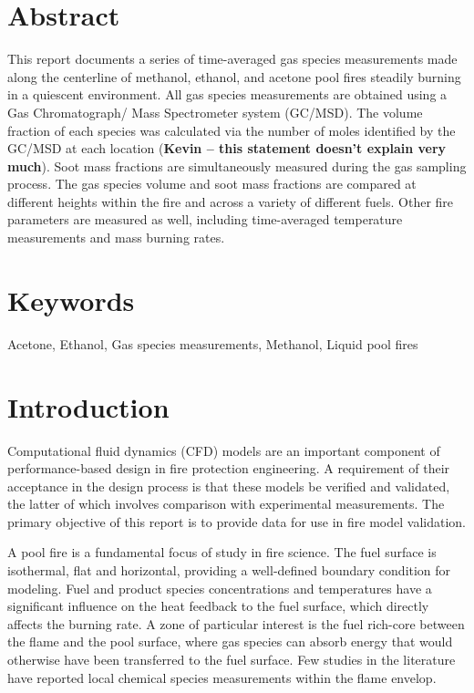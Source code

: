 \documentclass[12pt]{article}
\begin{document}
\section*{Abstract}
This report documents a series of time-averaged gas species measurements made along the centerline of methanol, ethanol, and acetone pool fires steadily burning in a quiescent environment. All gas species measurements are obtained using a Gas Chromatograph/ Mass Spectrometer system (GC/MSD). The volume fraction of each species was calculated via the number of moles identified by the GC/MSD at each location ({\bf Kevin -- this statement doesn't explain very much}). Soot mass fractions are simultaneously measured during the gas sampling process. The gas species volume and soot mass fractions are compared at different heights within the fire and across a variety of different fuels. Other fire parameters are measured as well, including time-averaged temperature measurements and mass burning rates.
\section*{Keywords}
\normalsize Acetone, Ethanol, Gas species measurements, Methanol, Liquid pool fires \\
\pagebreak
\begin{center}
	\tableofcontents
	\listoftables
	\listoffigures
\end{center}
\pagebreak
\section{Introduction}
\label{sec:intro}
Computational fluid dynamics (CFD) models are an important component of performance-based design in fire protection engineering. A requirement of their acceptance in the design process is that these models be verified and validated, the latter of which involves comparison with experimental measurements. The primary objective of this report is to provide data for use in fire model validation.

A pool fire is a fundamental focus of study in fire science. The fuel surface is isothermal, flat and horizontal, providing a well-defined boundary condition for modeling. Fuel and product species concentrations and temperatures have a significant influence on the heat feedback to the fuel surface, which directly affects the burning rate. A zone of particular interest is the fuel rich-core between the flame and the pool surface, where gas species can absorb energy that would otherwise have been transferred to the fuel surface. Few studies in the literature have reported local chemical species measurements within the flame envelop.
\end{document}

